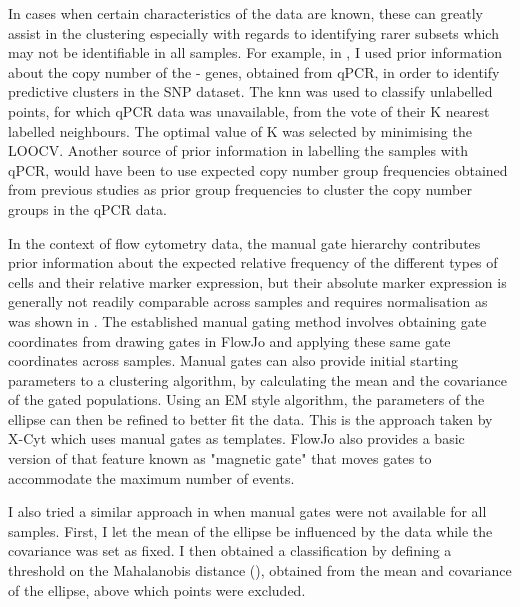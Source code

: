 In cases when certain characteristics of the data are known, these can greatly assist in the clustering especially with regards to identifying rarer subsets which may not be identifiable in all samples.
For example, in , I used prior information about the copy number of the - genes, obtained from qPCR, in order to identify predictive clusters in the SNP dataset.
The \gls{knn} was used to classify unlabelled points, for which qPCR data was unavailable, from the vote of their K nearest labelled neighbours.
The optimal value of K was selected by minimising the \gls{LOOCV}.
Another source of prior information in labelling the samples with qPCR, would have been to use expected copy number group frequencies obtained from previous studies \citep{Jiang:2012cf} as prior group frequencies to cluster the copy number groups in the qPCR data.

In the context of flow cytometry data, the manual gate hierarchy contributes prior information about the expected relative frequency of the different types of cells and their relative marker expression, but their absolute marker expression is generally not readily comparable across samples and requires normalisation as was shown in .
The established manual gating method involves obtaining gate coordinates from drawing gates in FlowJo and applying these same
gate coordinates across samples.
Manual gates can also provide initial starting parameters to a clustering algorithm,
by calculating the mean and the covariance of the gated populations.
Using an EM style algorithm, the parameters of the ellipse can then be refined to better fit the data.
This is the approach taken by X-Cyt \citep{Hu:2013bg} which uses manual gates as templates.
FlowJo also provides a basic version of that feature known as "magnetic gate" that moves gates to accommodate the maximum number of events.

I also tried a similar approach in  when manual gates were not available for all samples.
First, I let the mean of the ellipse be influenced by the data while the covariance was set as fixed.
I then obtained a classification by defining a threshold on the Mahalanobis distance (), obtained from the mean and covariance of the ellipse, above which points were excluded.

